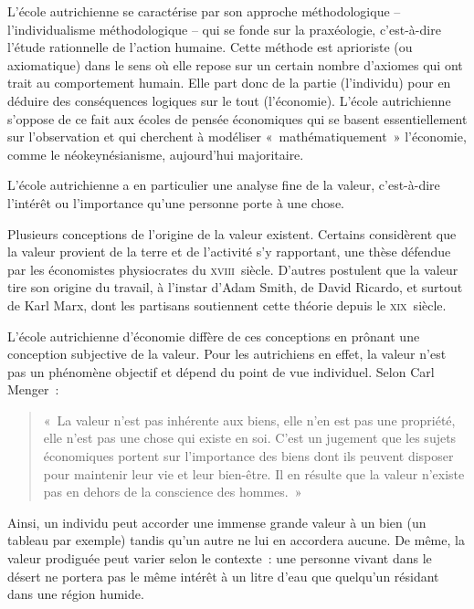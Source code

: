 L'école autrichienne se caractérise par son approche méthodologique -- l'individualisme méthodologique -- qui se fonde sur la praxéologie, c'est-à-dire l'étude rationnelle de l'action humaine. Cette méthode est aprioriste (ou axiomatique) dans le sens où elle repose sur un certain nombre d'axiomes qui ont trait au comportement humain. Elle part donc de la partie (l'individu) pour en déduire des conséquences logiques sur le tout (l'économie). L'école autrichienne s'oppose de ce fait aux écoles de pensée économiques qui se basent essentiellement sur l'observation et qui cherchent à modéliser «~mathématiquement~» l'économie, comme le néokeynésianisme, aujourd'hui majoritaire.


L'école autrichienne a en particulier une analyse fine de la valeur, c'est-à-dire l'intérêt ou l'importance qu'une personne porte à une chose.

Plusieurs conceptions de l'origine de la valeur existent. Certains considèrent que la valeur provient de la terre et de l'activité s'y rapportant, une thèse défendue par les économistes physiocrates du \textsc{xviii}\ieme{}~siècle. D'autres postulent que la valeur tire son origine du travail, à l'instar d'Adam Smith, de David Ricardo, et surtout de Karl Marx, dont les partisans soutiennent cette théorie depuis le \textsc{xix}\ieme{}~siècle.

L'école autrichienne d'économie diffère de ces conceptions en prônant une conception subjective de la valeur. Pour les autrichiens en effet, la valeur n'est pas un phénomène objectif et dépend du point de vue individuel. Selon Carl Menger~: 

\begin{quote}
«~La valeur n'est pas inhérente aux biens, elle n'en est pas une propriété, elle n'est pas une chose qui existe en soi. C'est un jugement que les sujets économiques portent sur l'importance des biens dont ils peuvent disposer pour maintenir leur vie et leur bien-être. Il en résulte que la valeur n'existe pas en dehors de la conscience des hommes.~»
\end{quote}

Ainsi, un individu peut accorder une immense grande valeur à un bien (un tableau par exemple) tandis qu'un autre ne lui en accordera aucune. De même, la valeur prodiguée peut varier selon le contexte~: une personne vivant dans le désert ne portera pas le même intérêt à un litre d'eau que quelqu'un résidant dans une région humide.

